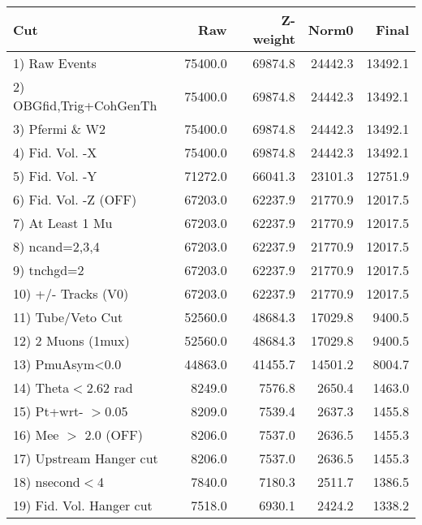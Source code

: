  \begin{table}[h!]\centering
 \begin{tabular}{||l||r|r|r|r||}
 \hline
 \hline
 Cut & Raw & Z-weight & Norm0 & Final \\
 \hline
  1) Raw Events           &     75400.0 &     69874.8 &     24442.3 &     13492.1 \\
  2) OBGfid,Trig+CohGenTh &     75400.0 &     69874.8 &     24442.3 &     13492.1 \\
  3) Pfermi \& W2         &     75400.0 &     69874.8 &     24442.3 &     13492.1 \\
  4) Fid. Vol. -X         &     75400.0 &     69874.8 &     24442.3 &     13492.1 \\
  5) Fid. Vol. -Y         &     71272.0 &     66041.3 &     23101.3 &     12751.9 \\
  6) Fid. Vol. -Z (OFF)   &     67203.0 &     62237.9 &     21770.9 &     12017.5 \\
  7) At Least 1 Mu        &     67203.0 &     62237.9 &     21770.9 &     12017.5 \\
  8) ncand=2,3,4          &     67203.0 &     62237.9 &     21770.9 &     12017.5 \\
  9) tnchgd=2             &     67203.0 &     62237.9 &     21770.9 &     12017.5 \\
 10) +/- Tracks (V0)      &     67203.0 &     62237.9 &     21770.9 &     12017.5 \\
 11) Tube/Veto Cut        &     52560.0 &     48684.3 &     17029.8 &      9400.5 \\
 12) 2 Muons (1mux)       &     52560.0 &     48684.3 &     17029.8 &      9400.5 \\
 13) PmuAsym<0.0          &     44863.0 &     41455.7 &     14501.2 &      8004.7 \\
 14) Theta$<$2.62 rad     &      8249.0 &      7576.8 &      2650.4 &      1463.0 \\
 15) Pt+wrt- $>$0.05      &      8209.0 &      7539.4 &      2637.3 &      1455.8 \\
 16) Mee $>$ 2.0  (OFF)   &      8206.0 &      7537.0 &      2636.5 &      1455.3 \\
 17) Upstream Hanger cut  &      8206.0 &      7537.0 &      2636.5 &      1455.3 \\
 18) nsecond$<$4          &      7840.0 &      7180.3 &      2511.7 &      1386.5 \\
 19) Fid. Vol. Hanger cut &      7518.0 &      6930.1 &      2424.2 &      1338.2 \\

\end{tabular}
\end{table}
